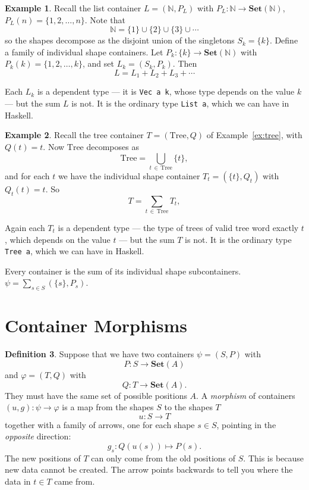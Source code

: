 \documentclass[11pt, a4paper]{article}
\theoremstyle{definition}
\newtheorem{definition}{Definition}[section]
\newtheorem{example}[definition]{Example}
\theoremstyle{plain}
\begin{document}
\begin{example}\label{ex:list-sum}
Recall the list container $L = (\mathbb{N}, P_L)$ with
$P_L : \mathbb{N} \to \mathbf{Set}(\mathbb{N})$,
$P_L(n) = \{1, 2, \ldots, n\}$.  Note that
\[
  \mathbb{N} = \{1\} \cup \{2\} \cup \{3\} \cup \cdots
\]
so the shapes decompose as the disjoint union of the singletons
$S_k = \{k\}$.  Define a family of individual shape containers.  Let
$P_k : \{k\} \to \mathbf{Set}(\mathbb{N})$ with
$P_k(k) = \{1, 2, \ldots, k\}$, and set $L_k = (S_k, P_k)$.  Then
\[
  L = L_1 + L_2 + L_3 + \cdots
\]
\noindent\colorbox{green!10}{\parbox{\dimexpr\linewidth-2\fboxsep}{%
Each $L_k$ is a dependent type --- it is \texttt{Vec a k}, whose
type depends on the value $k$ --- but the sum $L$ is not.  It is
the ordinary type \texttt{List a}, which we can have in Haskell.%
}}
\end{example}

\begin{example}\label{ex:tree-sum}
Recall the tree container $T = (\mathrm{Tree}, Q)$ of
Example~\ref{ex:tree}, with $Q(t) = t$.  Now $\mathrm{Tree}$
decomposes as
\[
  \mathrm{Tree} = \bigcup_{t \,\in\, \mathrm{Tree}} \{t\},
\]
and for each $t$ we have the individual shape container
$T_t = (\{t\}, Q_t)$ with $Q_t(t) = t$.  So
\[
  T = \sum_{t \,\in\, \mathrm{Tree}} T_t,
\]
\noindent\colorbox{green!10}{\parbox{\dimexpr\linewidth-2\fboxsep}{%
Again each $T_t$ is a dependent type --- the type of trees of valid tree word
exactly $t$, which depends on the value $t$ --- but the sum $T$ is
not.  It is the ordinary type \texttt{Tree a}, which we can have in
Haskell.%
}}
\end{example}

\begin{center}
\colorbox{blue!10}{\parbox{0.9\linewidth}{\centering
Every container is the sum of its individual shape subcontainers.
$\psi = \sum_{s \in S} (\{s\}, P_s)$.}}
\end{center}

\section{Container Morphisms}

\noindent\colorbox{gray!15}{\parbox{\dimexpr\linewidth-2\fboxsep}{%
\begin{definition}\label{def:morphism}
Suppose that we have two containers $\psi = (S, P)$ with
\[
  P : S \to \mathbf{Set}(A)
\]
and $\varphi = (T, Q)$ with
\[
  Q : T \to \mathbf{Set}(A).
\]
They must have the same set of possible positions $A$.
A \emph{morphism} of containers $(u, g) : \psi \to \varphi$ is a map
from the shapes $S$ to the shapes $T$
\[
  u : S \to T
\]
together with a family of arrows, one for each shape $s \in S$,
pointing in the \emph{opposite} direction:
\[
  g_s : Q(u(s)) \mapsto P(s).
\]
The new positions of $T$ can only come from the old positions of
$S$.  This is because new data cannot be created.  The arrow points
backwards to tell you where the data in $t \in T$ came from.
\end{definition}%
}}
\end{document}
